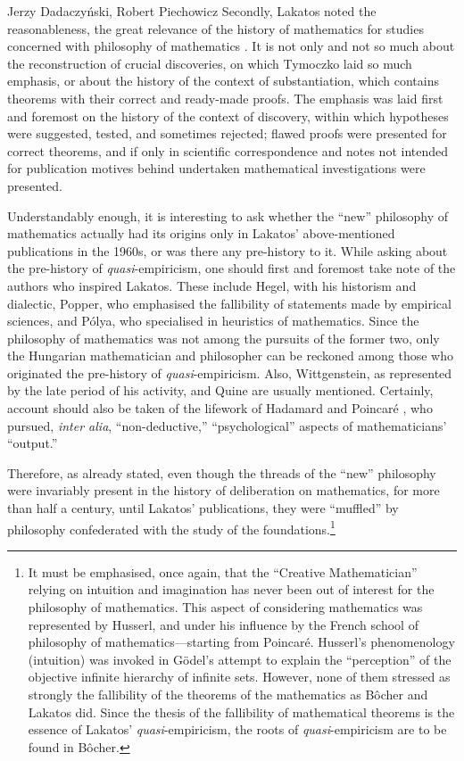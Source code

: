 \begin{artengenv}{Jerzy Dadaczyński, Robert Piechowicz}
Secondly, Lakatos noted the reasonableness, the great relevance of the history of mathematics for studies concerned with philosophy of mathematics
\parencite[][p.2]{lakatos_proofs_1976}.
 It is not only and not so much about the reconstruction of crucial discoveries, on which Tymoczko laid so much emphasis, or about the history of the context of substantiation, which contains theorems with their correct and ready-made proofs. The emphasis was laid first and foremost on the history of the context of discovery, within which hypotheses were suggested, tested, and sometimes rejected; flawed proofs were presented for correct theorems, and if only in scientific correspondence and notes not intended for publication motives behind undertaken mathematical investigations were presented.

Understandably enough, it is interesting to ask whether the ``new'' philosophy of mathematics actually had its origins only in Lakatos' above-mentioned publications in the 1960s, or was there any pre-history to it. While asking about the pre-history of \textit{quasi}-empiricism, one should first and foremost take note of the authors who inspired Lakatos. These include Hegel, with his historism and dialectic, Popper, who emphasised the fallibility of statements made by empirical sciences, and Pólya, who specialised in heuristics of mathematics. Since the philosophy of mathematics was not among the pursuits of the former two, only the Hungarian mathematician and philosopher can be reckoned among those who originated the pre-history of \textit{quasi}-empiricism. Also, Wittgenstein, as represented by the late period of his activity, and Quine are usually mentioned. Certainly, account should also be taken of the lifework of Hadamard
\parencite*[][]{hadamard_psychology_1945}
 and Poincaré 
\parencite*[][]{poincare_valeur_1904},
 who pursued, \textit{inter alia}, ``non-deductive,'' ``psychological'' aspects of mathematicians' ``output.''

Therefore, as already stated, even though the threads of the ``new'' philosophy were invariably present in the history of deliberation on mathematics, for more than half a century, until Lakatos' publications, they were ``muffled'' by philosophy confederated with the study of the foundations.\footnote{It must be emphasised, once again, that the ``Creative Mathematician'' relying on intuition and imagination has never been out of interest for the philosophy of mathematics. This aspect of considering mathematics was represented by Husserl, and under his influence by the French school of philosophy of mathematics---starting from Poincaré. Husserl's phenomenology (intuition) was invoked in Gödel's attempt to explain the ``perception'' of the objective infinite hierarchy of infinite sets. However, none of them stressed as strongly the fallibility of the theorems of the mathematics as Bôcher and Lakatos did. Since the thesis of the fallibility of mathematical theorems is the essence of Lakatos' \textit{quasi}-empiricism, the roots of \textit{quasi}-empiricism are to be found in Bôcher.}


\end{artengenv}
